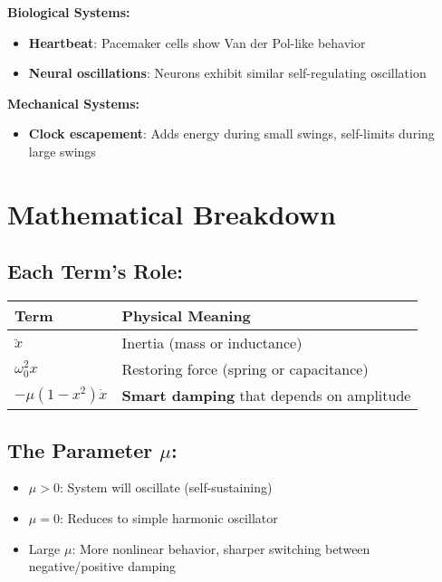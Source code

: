 \documentclass{article}
\begin{document}
\textbf{Biological Systems:}
\begin{itemize}
    \item \textbf{Heartbeat}: Pacemaker cells show Van der Pol-like behavior
    \item \textbf{Neural oscillations}: Neurons exhibit similar self-regulating oscillation
\end{itemize}

\textbf{Mechanical Systems:}
\begin{itemize}
    \item \textbf{Clock escapement}: Adds energy during small swings, self-limits during large swings
\end{itemize}

\section{Mathematical Breakdown}

\subsection{Each Term's Role:}

\begin{center}
\begin{tabular}{>{\centering\arraybackslash}m{3cm} >{\raggedright\arraybackslash}m{8cm}}
\toprule
\textbf{Term} & \textbf{Physical Meaning} \\
\midrule
$\ddot{x}$ & Inertia (mass or inductance) \\
$\omega_0^2 x$ & Restoring force (spring or capacitance) \\
$-\mu(1-x^2)\dot{x}$ & \textbf{Smart damping} that depends on amplitude \\
\bottomrule
\end{tabular}
\end{center}

\subsection{The Parameter $\mu$:}

\begin{itemize}
    \item $\mu > 0$: System will oscillate (self-sustaining)
    \item $\mu = 0$: Reduces to simple harmonic oscillator
    \item Large $\mu$: More nonlinear behavior, sharper switching between negative/positive damping
\end{itemize}
\end{document}
